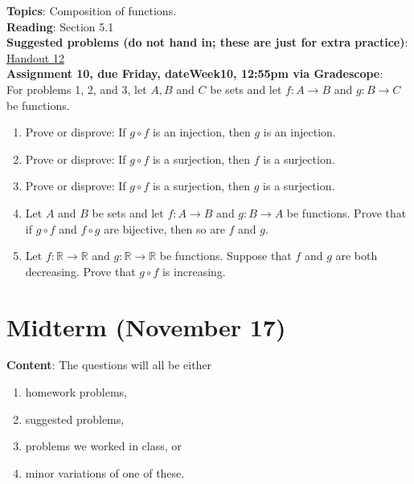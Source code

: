\documentclass[12pt]{article}
\newcommand{\HWdueTime}{12:55pm }
\newcommand{\warning}{
\smallskip
\begin{center}
  {\color{red} {\huge\Stopsign} \hspace{1pt}  IN PROGRESS!} {\color{blue}Check back later for the final assignment.} {\color{red} {\huge\Stopsign} }
\end{center}
\smallskip
\AddToShipoutPictureBG*{\AtTextLowerLeft{\llap{\rotatebox[origin=lb]{90}{\large\sffamily\hspace{2.5in}
  {\color{red} {\huge\Stopsign} \hspace{1pt}  IN PROGRESS!} {\color{blue}Check back later for the final assignment.} {\color{red} {\huge\Stopsign} }
      }\quad\rule{0.8pt}{\textheight}\enspace}}}
}
\newcommand{\R}{{\mathbb R}}
\begin{document}

\noindent\textbf{Topics}: Composition of functions.
\\

\noindent \textbf{Reading}: Section 5.1
\\


\noindent \textbf{Suggested problems (do not hand in; these are just for extra practice)}: \href{https://www.math.emory.edu/~dzb/teaching/250Spring2021/handouts/250-H12-compositions.pdf}{Handout 12}
\\

\noindent \textbf{Assignment 10, due Friday, \csname dateWeek10\endcsname, \HWdueTime via Gradescope}:
\\

\noindent For problems 1, 2, and 3, let $A, B$ and $C$ be sets and let $f \colon A \to B$ and $g \colon B \to C$ be functions. 
 \begin{enumerate}
 \item Prove or disprove: If $g\circ f$ is an injection, then $g$ is an injection.
 \item Prove or disprove: If $g\circ f$ is a surjection, then $f$ is a surjection.
 \item Prove or disprove: If $g\circ f$ is a surjection, then $g$ is a surjection.


\item Let $A$ and $B$ be sets and let $f \colon A \to B$ and $g \colon B \to A$ be functions. Prove that if $g \circ f$ and $f \circ g$ are bijective, then so are $f$ and $g$.

 \item Let $f \colon \R \to \R$ and $g \colon \R \to \R$ be functions. Suppose that $f$ and $g$ are both decreasing. Prove that $g \circ f$ is increasing.
 \end{enumerate}



\newpage
\section[ (November 17) Midterm]{Midterm (November 17)}


\noindent \textbf{Content}: The questions will all be either
\begin{enumerate}
\item homework problems,
\item suggested problems,
\item problems we worked in class, or
\item minor variations of one of these.
\end{enumerate}
\end{document}
